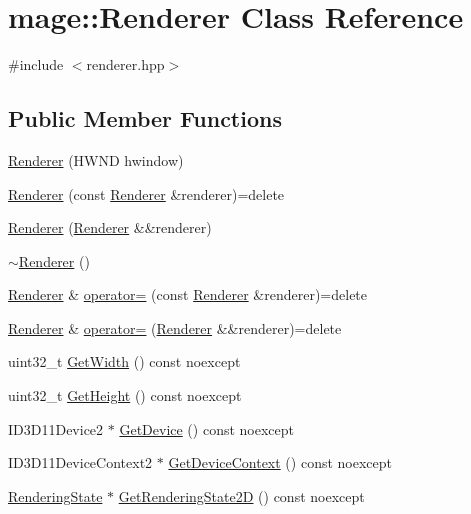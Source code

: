 \hypertarget{classmage_1_1_renderer}{}\section{mage\+:\+:Renderer Class Reference}
\label{classmage_1_1_renderer}


{\ttfamily \#include $<$renderer.\+hpp$>$}

\subsection*{Public Member Functions}
\begin{DoxyCompactItemize}
\item 
\hyperlink{classmage_1_1_renderer_a762dcda433c319af237d1dfd9bc6095f}{Renderer} (H\+W\+ND hwindow)
\item 
\hyperlink{classmage_1_1_renderer_acd6b509da2bd7e7d764b45b912fe5298}{Renderer} (const \hyperlink{classmage_1_1_renderer}{Renderer} \&renderer)=delete
\item 
\hyperlink{classmage_1_1_renderer_a24a9346ca7aed427b49d0e4ed4984da3}{Renderer} (\hyperlink{classmage_1_1_renderer}{Renderer} \&\&renderer)
\item 
\hyperlink{classmage_1_1_renderer_a997e041f28cc71d069d1ab7d29fe6ced}{$\sim$\+Renderer} ()
\item 
\hyperlink{classmage_1_1_renderer}{Renderer} \& \hyperlink{classmage_1_1_renderer_a2762ead5f771ae95e4293cd7eb1a2834}{operator=} (const \hyperlink{classmage_1_1_renderer}{Renderer} \&renderer)=delete
\item 
\hyperlink{classmage_1_1_renderer}{Renderer} \& \hyperlink{classmage_1_1_renderer_aa381bb89bffdc8ea2d8e3625e28cd28a}{operator=} (\hyperlink{classmage_1_1_renderer}{Renderer} \&\&renderer)=delete
\item 
uint32\+\_\+t \hyperlink{classmage_1_1_renderer_a140938e7d5f576163d39ce249ebda99f}{Get\+Width} () const noexcept
\item 
uint32\+\_\+t \hyperlink{classmage_1_1_renderer_adc6940516d809d1916c627d6ce3837fe}{Get\+Height} () const noexcept
\item 
I\+D3\+D11\+Device2 $\ast$ \hyperlink{classmage_1_1_renderer_a9510b8784447ed0fa9b43e7a4bf1fc80}{Get\+Device} () const noexcept
\item 
I\+D3\+D11\+Device\+Context2 $\ast$ \hyperlink{classmage_1_1_renderer_a13df5f31b3d18d2f4428743ebd7ffbe5}{Get\+Device\+Context} () const noexcept
\item 
\hyperlink{structmage_1_1_rendering_state}{Rendering\+State} $\ast$ \hyperlink{classmage_1_1_renderer_a4259de775cde2ce71b426f8e88a3afe2}{Get\+Rendering\+State2D} () const noexcept

\end{DoxyCompactItemize}
